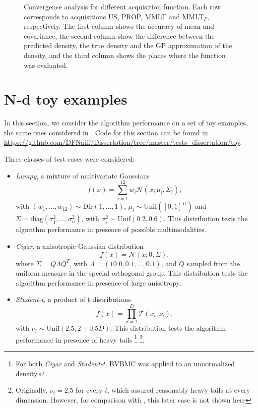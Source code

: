 \begin{figure}
	\caption[Accuracy analysis for different acquisition function.]{\label{acquisition} Convergence analysis for different acquisition function. Each row corresponds to acquisitions US, PROP, MMLT and MMLT$_P$, respectively. The first column shows the accuracy of mean and covariance, the second column show the difference between the predicted density, the true density and the GP approximation of the density, and the third column shows the places where the function was evaluated.}
\end{figure}

\newpage
\section{N-d toy examples}
In this section, we consider the algorithm performance on a set of toy examples, the same ones considered in \cite{Acerbi_2018}. Code for this section can be found in \url{https://github.com/DFNaiff/Dissertation/tree/master/tests_dissertation/toy}.

Three classes of test cases were considered:
\begin{itemize}
\item \textit{Lumpy}, a mixture of multivariate Gaussians
\begin{equation}
f(x) = \sum_{i=1}^{12} w_i \mathcal{N}(x;\mu_i,\Sigma_i),
\end{equation}
with $(w_1,\ldots,w_{12}) \sim \text{Dir}(1,\ldots,1)$, $\mu_i \sim \text{Unif}([0,1]^D)$ and $\Sigma = \text{diag}(\sigma_1^2,\ldots,\sigma_n^2)$, with $\sigma_i^2 \sim \text{Unif}(0.2,0.6)$. This distribution tests the algorithm performance in presence of possible multimodalities.

\item \textit{Cigar}, a anisotropic Gaussian distribution
\begin{equation}
f(x) = \mathcal{N}(x;0,\Sigma),
\end{equation}
where $\Sigma = Q \Lambda Q^T$, with $\Lambda = (10.0,0.1,\ldots,0.1)$, and $Q$ sampled from the uniform measure in the special orthogonal group. This distribution tests the algorithm performance in presence of large anisotropy.

\item \textit{Student-t}, a product of t distributions 
\begin{equation}
f(x) =  \prod_{d=1}^D \mathcal{T}(x_i;\nu_i),
\end{equation}
with $\nu_i \sim \text{Unif}(2.5,2+0.5D)$. This distribution tests the algorithm performance in presence of heavy tails \footnote{For both \textit{Cigar} and \textit{Student-t}, BVBMC was applied to an unnormalized density.} \footnote{Originally, $\nu_i = 2.5$ for every $i$, which assured reasonably heavy tails at every dimension. However, for comparison with \cite{Acerbi_2018}, this later case is not shown here}.
\end{itemize}

